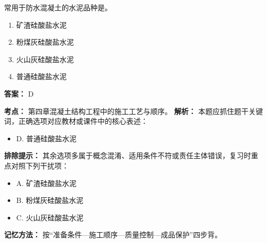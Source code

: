 \documentclass[UTF8,fontset=fandol,11pt]{ctexart}
\begin{document}
\begin{quizbox}[title={第 61 题}]
常用于防水混凝土的水泥品种是。\\
\begin{enumerate}[label=\Alph*.]
\item 矿渣硅酸盐水泥
\item 粉煤灰硅酸盐水泥
\item 火山灰硅酸盐水泥
\item 普通硅酸盐水泥
\end{enumerate}
\textbf{答案：} D
\vspace{0.25em}
\begin{answerbox}[title={考点解析}]
\textbf{考点：} 第四章混凝土结构工程中的施工工艺与顺序。
\textbf{解析：} 本题应抓住题干关键词，正确选项对应教材或课件中的核心表述：
\begin{itemize}
\item D. 普通硅酸盐水泥
\end{itemize}
\textbf{排除提示：} 其余选项多属于概念混淆、适用条件不符或责任主体错误，复习时重点对照下列干扰项：
\begin{itemize}
\item A. 矿渣硅酸盐水泥
\item B. 粉煤灰硅酸盐水泥
\item C. 火山灰硅酸盐水泥
\end{itemize}
\textbf{记忆方法：} 按“准备条件—施工顺序—质量控制—成品保护”四步背。
\end{answerbox}
\end{quizbox}

\vspace{0.2em}
\end{document}
